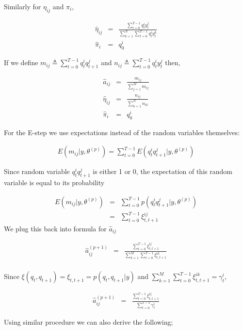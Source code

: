 Similarly for $\eta_{ij}$ and $\pi_i$,

\begin{eqnarray*}
\hat{\eta}_{ij} &=& \frac{\sum_{t=0}^{T-1} q_t^i y_t^j}{\sum_{k=1}^N
\sum_{t=0}^{T-1} q_t^i y_t^k} \\
\hat{\pi}_i &=& q_0^i
\end{eqnarray*}

If we define $m_{ij} \triangleq \sum_{t=0}^{T-1} q_t^i q_{t+1}^j$ and $n_{ij}
\triangleq \sum_{t=0}^{T-1} q_t^i y_t^j$ then,

\begin{eqnarray*}
\hat{a}_{ij}  &=& \frac{m_{ij}}{\sum_{j=1}^M m_{ij}}  \\
\hat{\eta}_{ij} &=& \frac{n_{ij}}{\sum_{k=1}^Nn_{ik}}\\
\hat{\pi}_i &=& q_0^i
\end{eqnarray*}

For the E-step we use expectations instead of the random variables themselves:

\begin{eqnarray*}
E(m_{ij}|y,\theta^{(p)}) = \sum_{t=0}^{T-1}E(q_t^i q_{t+1}^j|y,\theta^{(p)})
\end{eqnarray*}

Since random variable $q_t^i q_{t+1}^j$ is either 1 or 0, the expectation of
this random variable is equal to its probability

\begin{eqnarray*}
E(m_{ij}|y,\theta^{(p)}) &=& \sum_{t=0}^{T-1}p(q_t^i q_{t+1}^j|y,\theta^{(p)})\\
&=& \sum_{t=0}^{T-1} \xi_{t,t+1}^{ij}
\end{eqnarray*}
We plug this back into formula for $\hat{a}_{ij}$

\begin{eqnarray*}
\hat{a}_{ij}^{(p+1)}  &=& \frac{\sum_{t=0}^{T-1} \xi_{t,t+1}^{ij}}
    {\sum_{k=1}^M \sum_{t=0}^{T-1} \xi_{t,t+1}^{ik}}  \\
\end{eqnarray*}

Since $\xi(q_t,q_{t+1})=\xi_{t,t+1}=p(q_t,q_{t+1}|y)$ and $\sum_{k=1}^M \sum_{t=0}^{T-1}
\xi_{t,t+1}^{ik} = \gamma_t^i$,

\begin{eqnarray*}
\hat{a}_{ij}^{(p+1)}  &=& \frac{\sum_{t=0}^{T-1} \xi_{t,t+1}^{ij}}{\sum_{t=0}^{T-1} \gamma_t^i} 
\end{eqnarray*}

Using similar procedure we can also derive the following;

